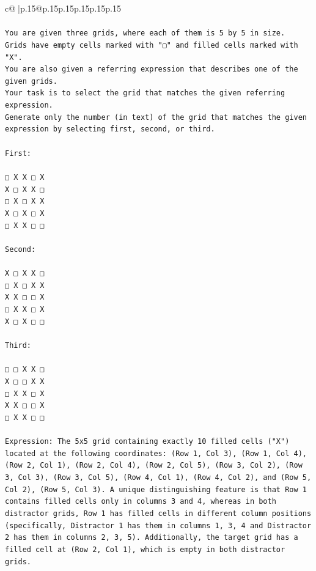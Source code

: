 \documentclass{article}
\begin{document}
{\begin{supertabular}{c@{$\;$}|p{.15\linewidth}@{}p{.15\linewidth}p{.15\linewidth}p{.15\linewidth}p{.15\linewidth}p{.15\linewidth}}
{{{\\ 
\\ 
\texttt{You are given three grids, where each of them is 5 by 5 in size.} \\
\texttt{Grids have empty cells marked with "▢" and filled cells marked with "X".} \\
\texttt{You are also given a referring expression that describes one of the given grids.} \\
\texttt{Your task is to select the grid that matches the given referring expression.} \\
\texttt{Generate only the number (in text) of the grid that matches the given expression by selecting first, second, or third.} \\
\\ 
\texttt{First:} \\
\\ 
\texttt{□ X X □ X} \\
\texttt{X □ X X □} \\
\texttt{□ X □ X X} \\
\texttt{X □ X □ X} \\
\texttt{□ X X □ □} \\
\\ 
\texttt{Second:} \\
\\ 
\texttt{X □ X X □} \\
\texttt{□ X □ X X} \\
\texttt{X X □ □ X} \\
\texttt{□ X X □ X} \\
\texttt{X □ X □ □} \\
\\ 
\texttt{Third:} \\
\\ 
\texttt{□ □ X X □} \\
\texttt{X □ □ X X} \\
\texttt{□ X X □ X} \\
\texttt{X X □ □ X} \\
\texttt{□ X X □ □} \\
\\ 
\texttt{Expression: The 5x5 grid containing exactly 10 filled cells ("X") located at the following coordinates: (Row 1, Col 3), (Row 1, Col 4), (Row 2, Col 1), (Row 2, Col 4), (Row 2, Col 5), (Row 3, Col 2), (Row 3, Col 3), (Row 3, Col 5), (Row 4, Col 1), (Row 4, Col 2), and (Row 5, Col 2), (Row 5, Col 3). A unique distinguishing feature is that Row 1 contains filled cells only in columns 3 and 4, whereas in both distractor grids, Row 1 has filled cells in different column positions (specifically, Distractor 1 has them in columns 1, 3, 4 and Distractor 2 has them in columns 2, 3, 5). Additionally, the target grid has a filled cell at (Row 2, Col 1), which is empty in both distractor grids.} \\
}}}
\end{supertabular}}
\end{document}
